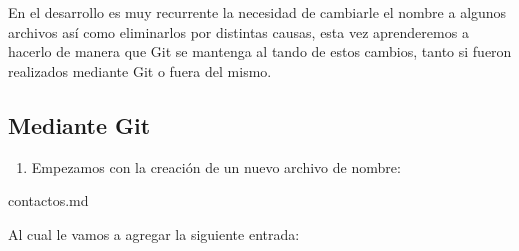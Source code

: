 \documentclass[
]{book}
\newenvironment{Shaded}{\begin{snugshade}}{\end{snugshade}}
\newcommand{\ExtensionTok}[1]{#1}
\providecommand{\tightlist}{%
  \setlength{\itemsep}{0pt}\setlength{\parskip}{0pt}}
\begin{document}
En el desarrollo es muy recurrente la necesidad de cambiarle el nombre a algunos archivos así como eliminarlos por distintas causas, esta vez aprenderemos a hacerlo de manera que Git se mantenga al tando de estos cambios, tanto si fueron realizados mediante Git o fuera del mismo.

\subsection{Mediante Git}\label{mediante-git}

\begin{enumerate}
\def\labelenumi{\arabic{enumi}.}
\tightlist
\item
  Empezamos con la creación de un nuevo archivo de nombre:
\end{enumerate}

\begin{Shaded}
\begin{Highlighting}[]
\ExtensionTok{contactos.md}
\end{Highlighting}
\end{Shaded}

Al cual le vamos a agregar la siguiente entrada:
\end{document}
